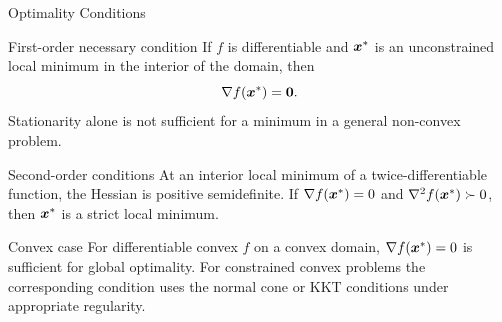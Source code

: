 \documentclass[aspectratio=169]{beamer}
\begin{document}
\begin{frame}{Optimality Conditions}
  \begin{theorembox}{First-order necessary condition}
    If $f$ is differentiable and $\boldsymbol{x}^*$ is an unconstrained local minimum in the interior of the domain, then
    $$\nabla f(\boldsymbol{x}^*)=\boldsymbol{0}.$$
    Stationarity alone is not sufficient for a minimum in a general non-convex problem.
  \end{theorembox}

  \vspace{0.4em}

  \begin{theorembox}{Second-order conditions}
    At an interior local minimum of a twice-differentiable function, the Hessian is positive semidefinite. If $\nabla f(\boldsymbol{x}^*)=0$ and $\nabla^2 f(\boldsymbol{x}^*)\succ0$, then $\boldsymbol{x}^*$ is a strict local minimum.
  \end{theorembox}

  \vspace{0.4em}

  \begin{block}{Convex case}
    For differentiable convex $f$ on a convex domain, $\nabla f(\boldsymbol{x}^*)=0$ is sufficient for global optimality. For constrained convex problems the corresponding condition uses the normal cone or KKT conditions under appropriate regularity.
  \end{block}
\end{frame}
\end{document}
